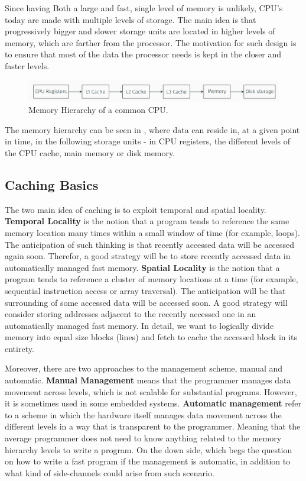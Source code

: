 Since having Both a large and fast, single level of memory is unlikely, CPU's
today are made with multiple levels of storage. The main idea is that
progressively bigger and slower storage units are located in higher levels of
memory, which are farther from the processor. The motivation for such design is
to ensure that most of the data the processor needs is kept in the closer and
faster levels.

\begin{figure}
    \centering
    \includegraphics[width=\textwidth]{images/chapter_6/MemHier.PNG}
    \caption{Memory Hierarchy of a common CPU.}
    \label{fig:MemHier}
\end{figure}

The memory hierarchy can be seen in , where data can reside
in, at a given point in time, in the following storage units - in CPU registers,
the different levels of the CPU cache, main memory or disk memory. 

\subsection{Caching Basics}
\label{subsec:cachingbasics}
The two main idea of caching is to exploit temporal and spatial locality.
\textbf{Temporal Locality} is the notion that a program tends to reference the
same memory location many times within a small window of time (for example,
loops). The anticipation of such thinking is that recently accessed data will be
accessed again soon. Therefor, a good strategy will be to store recently
accessed data in automatically managed fast memory. \textbf{Spatial Locality} is
the notion that a program tends to reference a cluster of memory locations at a
time (for example, sequential instruction access or array traversal). The
anticipation will be that surrounding of some accessed data will be accessed
soon. A good strategy will consider storing addresses adjacent to the recently
accessed one in an automatically managed fast memory. In detail, we want to
logically divide memory into equal size blocks (lines) and fetch to cache the
accessed block in its entirety.   

Moreover, there are two approaches to the management scheme, manual and
automatic. \textbf{Manual Management} means that the programmer manages data
movement across levels, which is not scalable for substantial programs. However,
it is sometimes used in some embedded systems. \textbf{Automatic management}
refer to a scheme in which the hardware itself manages data movement across the
different levels in a way that is transparent to the programmer. Meaning that
the average programmer does not need to know anything related to the memory
hierarchy levels to write a program. On the down side, which begs the question
on how to write a fast program if the management is automatic, in addition to
what kind of side-channels could arise from such scenario.

